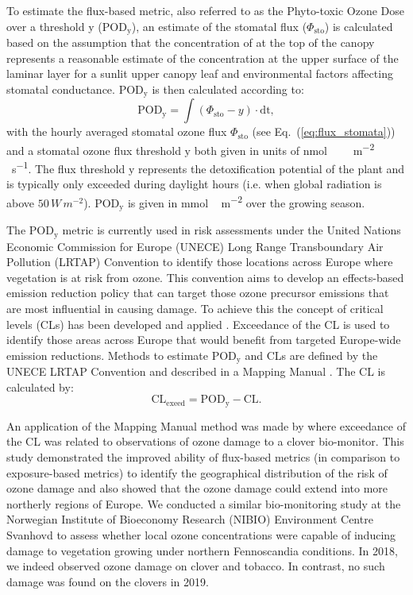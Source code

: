 \documentclass[bg, manuscript]{copernicus}
\begin{document}
To estimate the flux-based metric, also referred to as the Phyto-toxic Ozone Dose over a threshold y ($\mathrm{POD_y}$), an estimate of the stomatal  flux ($\Phi_\mathrm{sto}$) is calculated based on the assumption that the concentration of  at the top of the canopy represents a reasonable estimate of the concentration at the upper surface of the laminar layer for a sunlit upper canopy leaf and environmental factors affecting stomatal conductance. $\mathrm{POD_y}$ is then calculated according to:
%
\begin{equation}
  \mathrm{POD_y} = \int{(\Phi_\mathrm{sto}-y)\cdot \mathrm{dt}},
  \label{eq:pod}
\end{equation}
%
with the hourly averaged stomatal ozone flux $\Phi_\mathrm{sto}$ (see Eq.~(\ref{eq:flux_stomata})) and a stomatal ozone flux threshold $\mathrm{y}$ both given in units of \unit{nmol\,\,m^{-2}\,\,s^{-1}}. The flux threshold $\mathrm{y}$ represents the detoxification potential of the plant and is typically only exceeded during daylight hours (i.e. when global radiation is above $50\,\unit{W\,m^{-2}}$). $\mathrm{POD_y}$ is given in \unit{mmol\,m^{-2}} over the growing season.

The $\mathrm{POD_y}$ metric is currently used in risk assessments under the United Nations Economic Commission for Europe (UNECE) Long Range Transboundary Air Pollution (LRTAP) Convention to identify those locations across Europe where vegetation is at risk from ozone. This convention aims to develop an effects-based emission reduction policy that can target those ozone precursor emissions that are most influential in causing damage. To achieve this the concept of critical levels (CLs) has been developed and applied \citep{Maas2016}. Exceedance of the CL is used to identify those areas across Europe that would benefit from targeted Europe-wide emission reductions. Methods to estimate $\mathrm{POD_y}$ and CLs are defined by the UNECE LRTAP Convention and described in a Mapping Manual \citep{ICP:MappingManual2017}. The CL is calculated by: 
%
\begin{equation}
  \mathrm{CL_{exeed}} = \mathrm{POD_y} - \mathrm{CL}.
\end{equation}
%

An application of the Mapping Manual method was made by \citet{GCB:Mills2011} where exceedance of the CL was related to observations of ozone damage to a clover bio-monitor. This study demonstrated the improved ability of flux-based metrics (in comparison to exposure-based metrics) to identify the geographical distribution of the risk of ozone damage and also showed that the ozone damage could extend into more northerly regions of Europe. We conducted a similar bio-monitoring study at the Norwegian Institute of Bioeconomy Research (NIBIO) Environment Centre Svanhovd to assess whether local ozone concentrations were capable of inducing damage to vegetation growing under northern Fennoscandia conditions. In 2018, we indeed observed ozone damage on clover and tobacco. In contrast, no such damage was found on the clovers in 2019.
\end{document}
